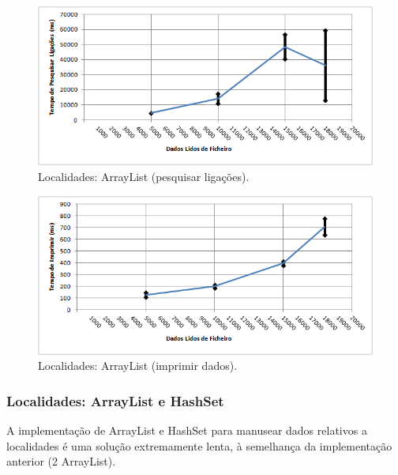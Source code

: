 \documentclass[a5paper,twocolumn, 11pt]{article}
\begin{document}
\begin{figure}[h!b!t!]
    \caption[Localidades: ArrayList (pesquisar ligações)]{Localidades: ArrayList (pesquisar ligações).}
    \label{hashtable}
    \centering
        \includegraphics[width=400pt]{cloc_conf1_o4.png}
\end{figure}
\begin{figure}[h!b!t!]
    \caption[Localidades: ArrayList (imprimir dados)]{Localidades: ArrayList (imprimir dados).}
    \label{hashtable}
    \centering
        \includegraphics[width=400pt]{cloc_conf1_o5.png}
\end{figure}

\newpage
\twocolumn
\subsubsection[Localidades:\\ArrayList e HashSet]{Localidades: \vbox{ArrayList e HashSet}}
A implementação de ArrayList e HashSet para manusear dados relativos a localidades é uma solução extremamente lenta, à semelhança da implementação anterior (2 ArrayList).
\end{document}
